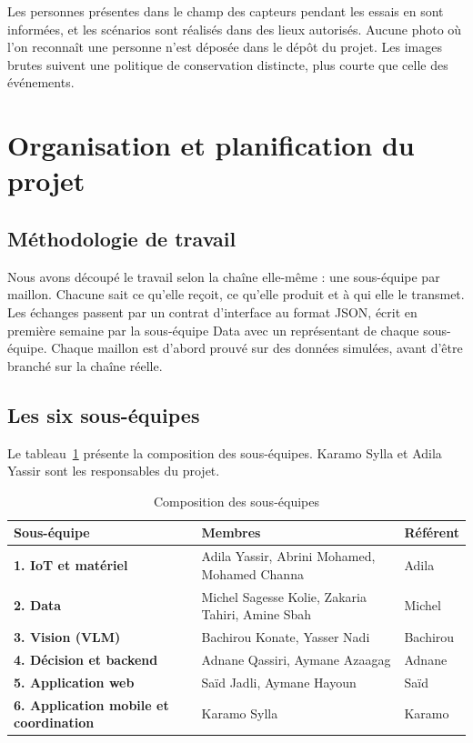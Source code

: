 Les personnes présentes dans le champ des capteurs pendant les essais en sont informées, et les scénarios sont
réalisés dans des lieux autorisés. Aucune photo où l'on reconnaît une personne n'est déposée dans le dépôt du
projet. Les images brutes suivent une politique de conservation distincte, plus courte que celle des événements.

\section{Organisation et planification du projet}

\subsection{Méthodologie de travail}

Nous avons découpé le travail selon la chaîne elle-même : une sous-équipe par maillon. Chacune sait ce qu'elle
reçoit, ce qu'elle produit et à qui elle le transmet. Les échanges passent par un contrat d'interface au format
JSON, écrit en première semaine par la sous-équipe Data avec un représentant de chaque sous-équipe. Chaque maillon
est d'abord prouvé sur des données simulées, avant d'être branché sur la chaîne réelle.

\subsection{Les six sous-équipes}

Le tableau~\ref{tab:equipes} présente la composition des sous-équipes. Karamo Sylla et Adila Yassir sont les
responsables du projet.

\begin{table}[H]
  \centering
  \small
  \begin{tabularx}{\linewidth}{>{\bfseries}p{4.2cm}Xp{2cm}}
    \toprule
    Sous-équipe & Membres & Référent \\
    \midrule
    1. IoT et matériel & Adila Yassir, Abrini Mohamed, Mohamed Channa & Adila \\
    2. Data & Michel Sagesse Kolie, Zakaria Tahiri, Amine Sbah & Michel \\
    3. Vision (VLM) & Bachirou Konate, Yasser Nadi & Bachirou \\
    4. Décision et backend & Adnane Qassiri, Aymane Azaagag & Adnane \\
    5. Application web & Saïd Jadli, Aymane Hayoun & Saïd \\
    6. Application mobile et coordination & Karamo Sylla & Karamo \\
    \bottomrule
  \end{tabularx}
  \caption{Composition des sous-équipes}
  \label{tab:equipes}
\end{table}

